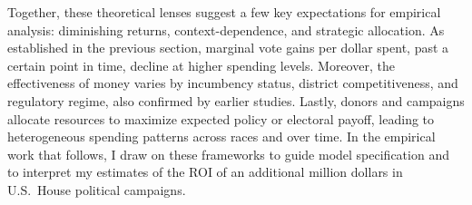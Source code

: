 \indent Together, these theoretical lenses suggest a few key expectations for empirical analysis: diminishing returns, context-dependence, and strategic allocation. As established in the previous section, marginal vote gains per dollar spent, past a certain point in time, decline at higher spending levels. Moreover, the effectiveness of money varies by incumbency status, district competitiveness, and regulatory regime, also confirmed by earlier studies. Lastly, donors and campaigns allocate resources to maximize expected policy or electoral payoff, leading to heterogeneous spending patterns across races and over time. In the empirical work that follows, I draw on these frameworks to guide model specification and to interpret my estimates of the ROI of an additional million dollars in U.S.\ House political campaigns.
